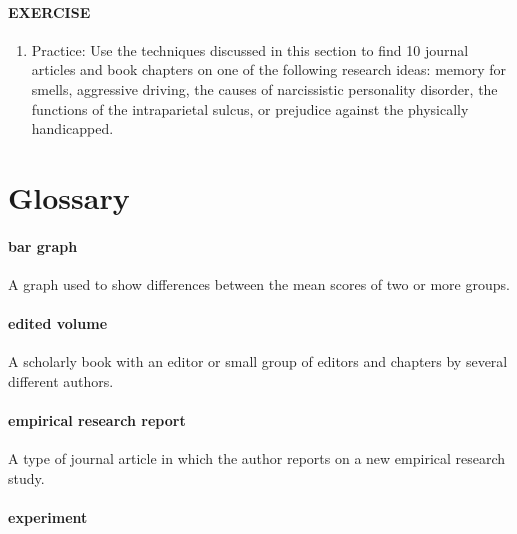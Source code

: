 \documentclass[
]{krantz}
\providecommand{\tightlist}{%
  \setlength{\itemsep}{0pt}\setlength{\parskip}{0pt}}
\begin{document}
\hypertarget{exercise-5}{%
\paragraph*{EXERCISE}\label{exercise-5}}

\begin{enumerate}
\def\labelenumi{\arabic{enumi}.}
\tightlist
\item
  Practice: Use the techniques discussed in this section to find 10 journal articles and book chapters on one of the following research ideas: memory for smells, aggressive driving, the causes of narcissistic personality disorder, the functions of the intraparietal sulcus, or prejudice against the physically handicapped.
\end{enumerate}

\hypertarget{glossary-10}{%
\section{Glossary}\label{glossary-10}}

\hypertarget{bar-graph-1}{%
\paragraph*{bar graph}\label{bar-graph-1}}

A graph used to show differences between the mean scores of two or more groups.

\hypertarget{edited-volume}{%
\paragraph*{edited volume}\label{edited-volume}}

A scholarly book with an editor or small group of editors and chapters by several different authors.

\hypertarget{empirical-research-report}{%
\paragraph*{empirical research report}\label{empirical-research-report}}

A type of journal article in which the author reports on a new empirical research study.

\hypertarget{experiment-2}{%
\paragraph*{experiment}\label{experiment-2}}
\end{document}
